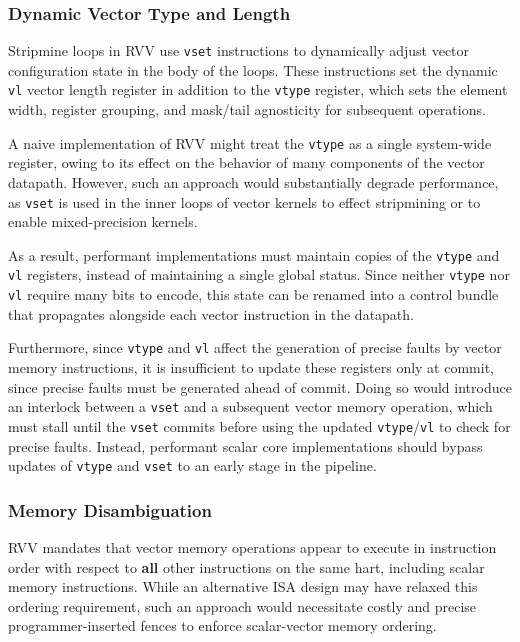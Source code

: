 \subsubsection{Dynamic Vector Type and Length}

Stripmine loops in RVV use \texttt{vset} instructions to dynamically adjust vector configuration state in the body of the loops.
These instructions set the dynamic \texttt{vl} vector length register in addition to the \texttt{vtype} register, which sets the element width, register grouping, and mask/tail agnosticity for subsequent operations.

A naive implementation of RVV might treat the \texttt{vtype} as a single system-wide register, owing to its effect on the behavior of many components of the vector datapath.
However, such an approach would substantially degrade performance, as \texttt{vset} is used in the inner loops of vector kernels to effect stripmining or to enable mixed-precision kernels.

As a result, performant implementations must maintain copies of the \texttt{vtype} and \texttt{vl} registers, instead of maintaining a single global status.
Since neither \texttt{vtype} nor \texttt{vl} require many bits to encode, this state can be renamed into a control bundle that propagates alongside each vector instruction in the datapath.

Furthermore, since \texttt{vtype} and \texttt{vl} affect the generation of precise faults by vector memory instructions, it is insufficient to update these registers only at commit, since precise faults must be generated ahead of commit.
Doing so would introduce an interlock between a \texttt{vset} and a subsequent vector memory operation, which must stall until the \texttt{vset} commits before using the updated \texttt{vtype}/\texttt{vl} to check for precise faults.
Instead, performant scalar core implementations should bypass updates of \texttt{vtype} and \texttt{vset} to an early stage in the pipeline.


\subsubsection{Memory Disambiguation}

RVV mandates that vector memory operations appear to execute in instruction order with respect to \textbf{all} other instructions on the same hart, including scalar memory instructions.
While an alternative ISA design may have relaxed this ordering requirement, such an approach would necessitate costly and precise programmer-inserted fences to enforce scalar-vector memory ordering.

